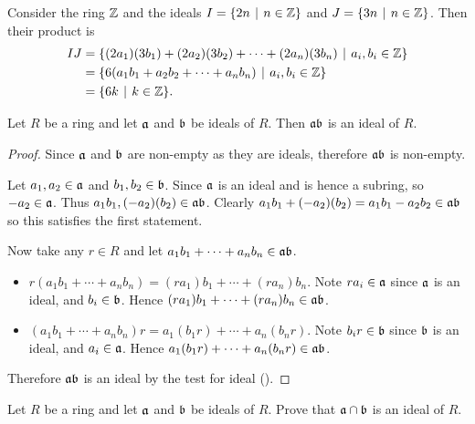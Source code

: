 \begin{example}
    Consider the ring $\mathbb{Z}$ and the ideals $I = \{2n \vert n \in \Z\}$ and $J = \{3n \vert n \in \Z\}$. Then their product is
    \begin{align*}
        IJ &= \{(2a_1)(3b_1) + (2a_2)(3b_2) + \cdots + (2a_n)(3b_n) \vert a_i,b_i \in \Z\}\\
        &= \{6(a_1b_1 + a_2b_2 + \cdots + a_nb_n) \vert a_i,b_i \in \Z\}\\
        &= \{6k \vert k \in \Z\}.
    \end{align*}
\end{example}

\begin{proposition}\label{prop-product-of-ideals-is-ideal}
    Let $R$ be a ring and let $\mathfrak{a}$ and $\mathfrak{b}$ be ideals of $R$. Then $\mathfrak{ab}$ is an ideal of $R$.
\end{proposition}
\begin{proof}
    Since $\mathfrak{a}$ and $\mathfrak{b}$ are non-empty as they are ideals, therefore $\mathfrak{ab}$ is non-empty.

    Let $a_1,a_2 \in \mathfrak{a}$ and $b_1,b_2 \in \mathfrak{b}$. Since $\mathfrak{a}$ is an ideal and is hence a subring, so $-a_2 \in \mathfrak{a}$. Thus $a_1b_1, (-a_2)(b_2) \in \mathfrak{ab}$. Clearly $a_1b_1 + (-a_2)(b_2) = a_1b_1 - a_2b_2 \in \mathfrak{ab}$ so this satisfies the first statement.

    Now take any $r \in R$ and let $a_1b_1 + \cdots + a_nb_n \in \mathfrak{ab}$.
    \begin{itemize}
        \item $r(a_1b_1 + \cdots + a_nb_n) = (ra_1)b_1 + \cdots + (ra_n)b_n$. Note $ra_i \in \mathfrak{a}$ since $\mathfrak{a}$ is an ideal, and $b_i \in \mathfrak{b}$. Hence $(ra_1)b_1 + \cdots + (ra_n)b_n \in \mathfrak{ab}$.
        \item $(a_1b_1 + \cdots + a_nb_n)r = a_1(b_1r) + \cdots + a_n(b_nr)$. Note $b_ir \in \mathfrak{b}$ since $\mathfrak{b}$ is an ideal, and $a_i \in \mathfrak{a}$. Hence $a_1(b_1r) + \cdots + a_n(b_nr) \in \mathfrak{ab}$.
    \end{itemize}

    Therefore $\mathfrak{ab}$ is an ideal by the test for ideal ().
\end{proof}

\begin{exercise}
    Let $R$ be a ring and let $\mathfrak{a}$ and $\mathfrak{b}$ be ideals of $R$. Prove that $\mathfrak{a} \cap \mathfrak{b}$ is an ideal of $R$.
\end{exercise}

